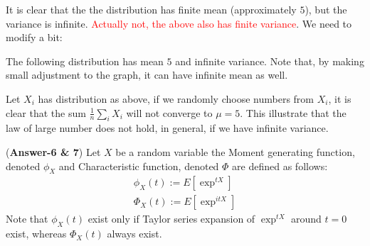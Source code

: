 \documentclass[11pt,twoside,reqno]{article}
\newcommand{\e}{\exp}
\begin{document}
It is clear that the the distribution has finite mean (approximately $5$), but the variance is infinite. \textcolor{red}{Actually not, the above also has finite variance}. We need to modify a bit:

The following distribution has mean $5$ and infinite variance. Note that, by making small adjustment to the graph, it can have infinite mean as well. 
\begin{center}
\end{center}

Let $X_i$ has distribution as above, if we randomly choose numbers from $X_i$, it is clear that the sum $\frac{1}{n}\sum_i X_i$ will not converge to $\mu = 5$. This 
illustrate that the law of large number does not hold, in general, if we have infinite variance. 

({\bf Answer-6 \& 7})
Let $X$ be a random variable the Moment generating function, denoted $\phi_X$ and Characteristic function, denoted $\Phi$ are defined as follows:
\begin{eqnarray*}
\phi_X(t) := E[\e^{tX}] \\
\Phi_X(t) := E[\e^{itX}]
\end{eqnarray*}
Note that $\phi_X(t)$ exist only if Taylor series expansion of $\e^{tX}$ around $t=0$ exist, whereas $\Phi_X(t)$ always exist. 
\end{document}
